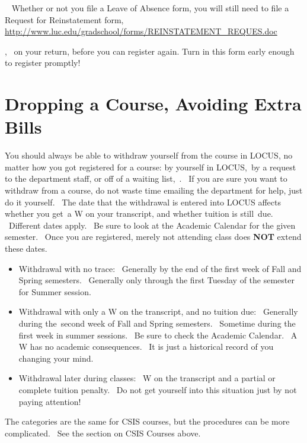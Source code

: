 \documentclass[letterpaper,10pt,english]{sphinxmanual}
\begin{document}
  Whether or not you file a Leave of Absence form, you will still need
to file a Request for Reinstatement form,
\href{http://www.luc.edu/gradschool/forms/REINSTATEMENT\_REQUES.doc}{http://www.luc.edu/gradschool/forms/REINSTATEMENT\_REQUES.doc}

,  on your return, before you can register again. Turn in this form
early enough to register promptly!


\section{Dropping a Course, Avoiding Extra Bills}
\label{regulations:dropping-a-course-avoiding-extra-bills}
You should always be able to withdraw yourself from the course in LOCUS,
no matter how you got registered for a course: by yourself in LOCUS, by
a request to the department staff, or off of a waiting list, .  If you
are sure you want to withdraw from a course, do not waste time emailing
the department for help, just do it yourself.  The date that the
withdrawal is entered into LOCUS affects whether you get a W on your
transcript, and whether tuition is still due.  Different dates apply.
 Be sure to look at the Academic Calendar for the given semester.  Once
you are registered, merely not attending class does \textbf{NOT} extend these
dates.
\begin{itemize}
\item {} 
Withdrawal with no trace:  Generally by the end of the first week of
Fall and Spring semesters.  Generally only through the first Tuesday
of the semester for Summer session.

\item {} 
Withdrawal with only a W on the transcript, and no tuition due:
 Generally during the second week of Fall and Spring semesters.
 Sometime during the first week in summer sessions.  Be sure to check
the Academic Calendar.  A W has no academic consequences.  It is just
a historical record of you changing your mind.

\item {} 
Withdrawal later during classes:  W on the transcript and a partial
or complete tuition penalty.  Do not get yourself into this situation
just by not paying attention!

\end{itemize}

The categories are the same for CSIS courses, but the procedures can be
more complicated.  See the section on CSIS Courses above.
\end{document}
